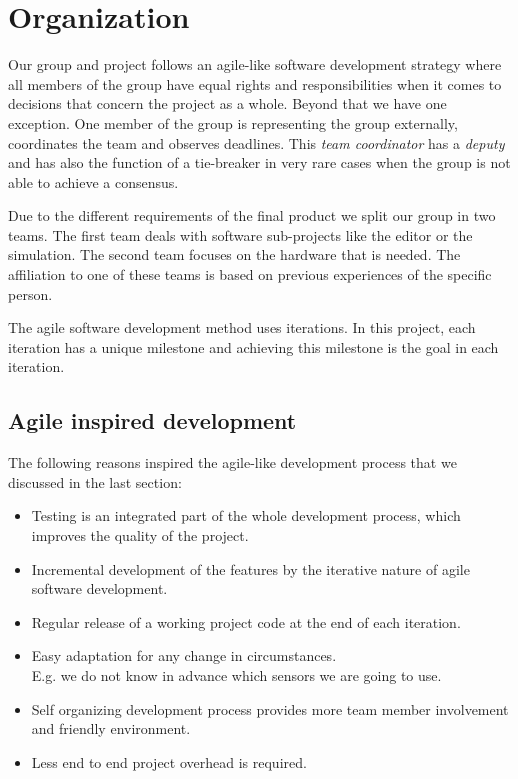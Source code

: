 \chapter{Organization}
\label{chapter:Organization}
Our group and project follows an agile-like software development strategy where all members of the group have equal rights and
responsibilities when it comes to decisions that concern the project as a whole.
Beyond that we have one exception. One member of the group is representing the group externally, coordinates the team and observes deadlines.
This \emph{team coordinator} has a \emph{deputy} and has also the function of a tie-breaker in very rare cases when the group is not able to achieve a consensus.

Due to the different requirements of the final product we split our group in two teams.
The first team deals with software sub-projects like the editor or the simulation.
The second team focuses on the hardware that is needed.
The affiliation to one of these teams is based on previous experiences of the specific person.

The agile software development method uses iterations.
In this project, each iteration has a unique milestone and achieving this milestone is the goal in each iteration.

\section{Agile inspired development}
The following reasons inspired the agile-like development process that we discussed in the last section:

\begin{itemize}
\item Testing is an integrated part of the whole development process, which improves the
quality of the project.
\item Incremental development of the features by the iterative nature of agile software
development.
\item Regular release of a working project code at the end of each iteration.
\item Easy adaptation for any change in circumstances.\\
	  E.g. we do not know in advance which sensors we are going to use.
\item Self organizing development process provides more team member involvement and
friendly environment.
\item Less end to end project overhead is required.
\end{itemize}

